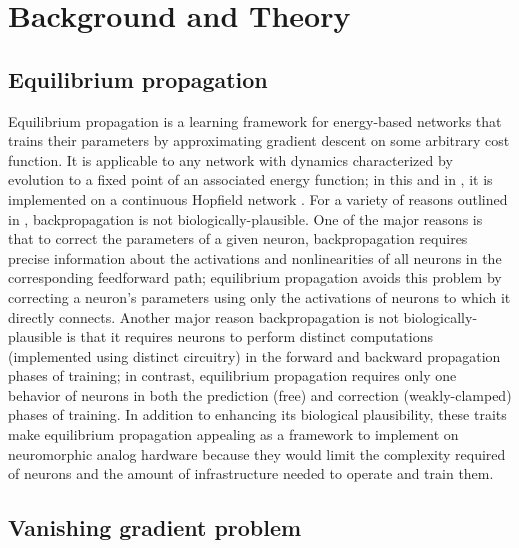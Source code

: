\documentclass[format=sigconf]{acmart}
\begin{document}
\section{Background and Theory}

\subsection{Equilibrium propagation}
\label{sec:eqp_formulation}

Equilibrium propagation \cite{scellier17} is a learning framework for energy-based networks that trains their parameters by approximating gradient descent on some arbitrary cost function. It is applicable to any network with dynamics characterized by evolution to a fixed point of an associated energy function; in this and in \cite{scellier17}, it is implemented on a continuous Hopfield network \cite{hopfield1984}. For a variety of reasons outlined in \cite{bengio2015}, backpropagation is not biologically-plausible. One of the major reasons is that to correct the parameters of a given neuron, backpropagation requires precise information about the activations and nonlinearities of all neurons in the corresponding feedforward path; equilibrium propagation avoids this problem by correcting a neuron's parameters using only the activations of neurons to which it directly connects. Another major reason backpropagation is not biologically-plausible is that it requires neurons to perform distinct computations (implemented using distinct circuitry) in the forward and backward propagation phases of training; in contrast, equilibrium propagation requires only one behavior of neurons in both the prediction (free) and correction (weakly-clamped) phases of training. In addition to enhancing its biological plausibility, these traits make equilibrium propagation appealing as a framework to implement on neuromorphic analog hardware because they would limit the complexity required of neurons and the amount of infrastructure needed to operate and train them.

\subsection{Vanishing gradient problem}
\label{sec:vangrad}
\end{document}
